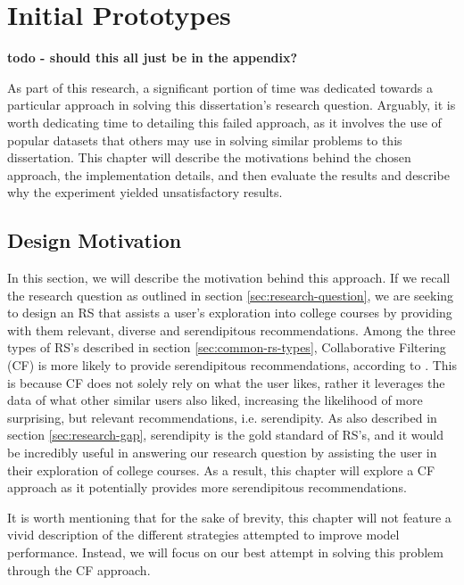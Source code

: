 \chapter{Initial Prototypes}
\label{chap:initial-prototypes}

\textbf{todo - should this all just be in the appendix?}

As part of this research, a significant portion of time was dedicated towards a particular approach in solving this dissertation's research question.
Arguably, it is worth dedicating time to detailing this failed approach, as it involves the use of popular datasets 
that others may use in solving similar problems to this dissertation.
This chapter will describe the motivations behind the chosen approach, the implementation details, and then evaluate 
the results and describe why the experiment yielded unsatisfactory results. 

\section{Design Motivation}

In this section, we will describe the motivation behind this approach.
If we recall the research question as outlined in section \ref{sec:research-question},
we are seeking to design an RS that assists a user's exploration into college courses
by providing with them relevant, diverse and serendipitous recommendations.
Among the three types of RS's described in section \ref{sec:common-rs-types},
Collaborative Filtering (CF) is more likely to provide serendipitous
recommendations, according to \cite{aggarwal2016recommender}.
This is because CF does not solely rely on what the user likes, rather it leverages the data of what other similar users also liked, 
increasing the likelihood of more surprising, but relevant recommendations, i.e. serendipity.
As also described in section \ref{sec:research-gap}, 
serendipity is the gold standard of RS's, and it would be incredibly useful in answering our research question by assisting the user in their exploration of college courses.
As a result, this chapter will explore a CF approach as it potentially provides more serendipitous recommendations.

It is worth mentioning that for the sake of brevity, 
this chapter will not feature a vivid description of the different strategies attempted to improve model performance.
Instead, we will focus on our best attempt in solving this problem through the CF approach.

